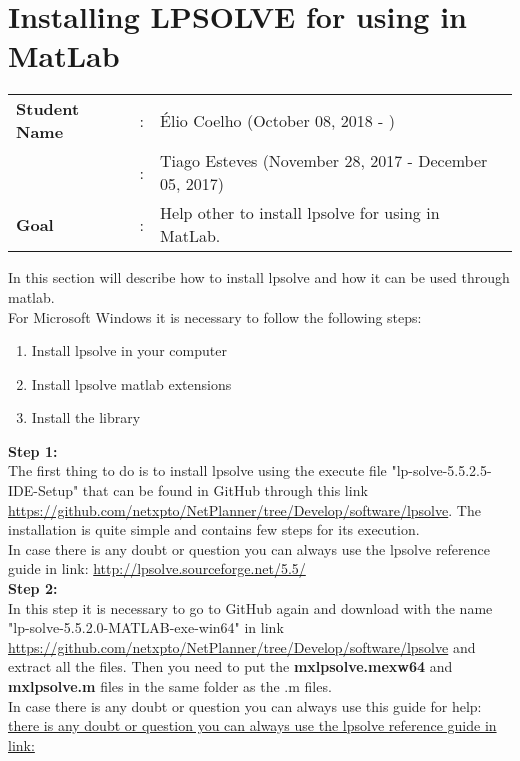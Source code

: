 \clearpage

\section{Installing LPSOLVE for using in MatLab}
\begin{tcolorbox}	
\begin{tabular}{p{2.75cm} p{0.2cm} p{10.5cm}} 	
\textbf{Student Name}  &:& \'Elio Coelho        (October 08, 2018 - )\\
						      &:& Tiago Esteves        (November 28, 2017 - December 05, 2017)\\
\textbf{Goal}          &:& Help other to install lpsolve for using in MatLab.
\end{tabular}
\end{tcolorbox}


In this section will describe how to install lpsolve and how it can be used through matlab. \\

For Microsoft Windows it is necessary to follow the following steps:
\begin{enumerate}
	\item Install lpsolve in your computer
	\item Install lpsolve matlab extensions
	\item Install the library
\end{enumerate}

\textbf{Step 1:}\\
The first thing to do is to install lpsolve using the execute file "lp-solve-5.5.2.5-IDE-Setup" that can be found in GitHub through this link \url{https://github.com/netxpto/NetPlanner/tree/Develop/software/lpsolve}. The installation is quite simple and contains few steps for its execution. \\
In case there is any doubt or question you can always use the lpsolve reference guide in link: \url{http://lpsolve.sourceforge.net/5.5/} \\

\textbf{Step 2:}\\
In this step it is necessary to go to GitHub again and download with the name "lp-solve-5.5.2.0-MATLAB-exe-win64" in link \url{https://github.com/netxpto/NetPlanner/tree/Develop/software/lpsolve} and extract all the files. Then you need to put the \textbf{mxlpsolve.mexw64} and \textbf{mxlpsolve.m} files in the same folder as the .m files. \\
In case there is any doubt or question you can always use this guide for help: \url{there is any doubt or question you can always use the lpsolve reference guide in link:} \\

